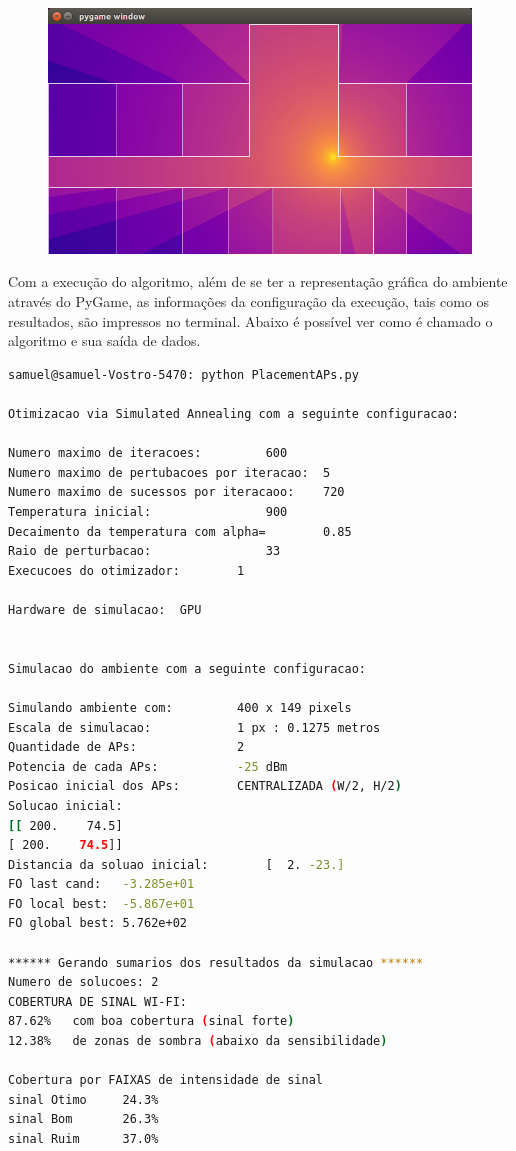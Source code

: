 \documentclass[
	12pt,				%
	openright,			%
	twoside,			%
	a4paper,			%
	english,			%
	french,				%
	spanish,			%
	brazil				%
	]{abntex2}
\begin{document}
\begin{figure}[htb]
\begin{minipage}{0.4\textwidth}
	\end{minipage}
	\hfill
	\begin{minipage}{0.4\textwidth}
		\centering \label{captura_4}
		\includegraphics[scale=0.3]{images/captura-4.jpg}
	\end{minipage}

\end{figure}

Com a execução do algoritmo, além de se ter a representação gráfica do ambiente através do PyGame, as informações da configuração da execução, tais como os resultados, são impressos no terminal. Abaixo é possível ver como é chamado o algoritmo e sua saída de dados.

\begin{lstlisting}[language=bash]
samuel@samuel-Vostro-5470: python PlacementAPs.py 

Otimizacao via Simulated Annealing com a seguinte configuracao:

Numero maximo de iteracoes:			600
Numero maximo de pertubacoes por iteracao:	5
Numero maximo de sucessos por iteracaoo:	720
Temperatura inicial:				900
Decaimento da temperatura com alpha=		0.85
Raio de perturbacao:				33
Execucoes do otimizador: 		1

Hardware de simulacao:	GPU


Simulacao do ambiente com a seguinte configuracao:

Simulando ambiente com:  		400 x 149 pixels
Escala de simulacao:     		1 px : 0.1275 metros
Quantidade de APs:       		2
Potencia de cada APs:    		-25 dBm
Posicao inicial dos APs: 		CENTRALIZADA (W/2, H/2)
Solucao inicial:
[[ 200.    74.5]
[ 200.    74.5]]
Distancia da soluao inicial:		[  2. -23.]
FO last cand:   -3.285e+01
FO local best:  -5.867e+01
FO global best: 5.762e+02

****** Gerando sumarios dos resultados da simulacao ******
Numero de solucoes:	2
COBERTURA DE SINAL WI-FI:
87.62%	 com boa cobertura (sinal forte)
12.38%	 de zonas de sombra (abaixo da sensibilidade)

Cobertura por FAIXAS de intensidade de sinal
sinal Otimo  	24.3%
sinal Bom    	26.3%
sinal Ruim   	37.0%

\end{lstlisting}
	
\end{document}
